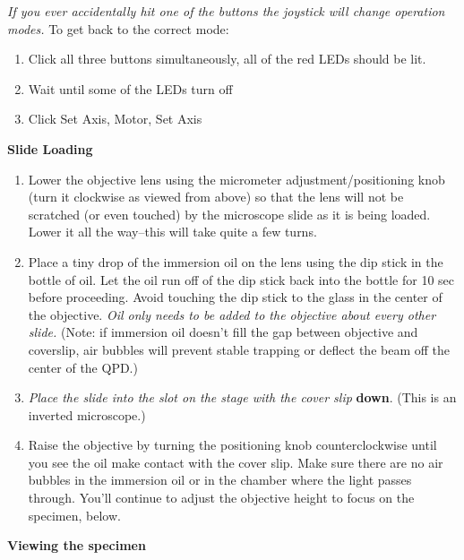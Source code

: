 \documentclass{../lab}
\begin{document}
\emph{If you ever accidentally hit one of the buttons the joystick will change operation modes.} To get back to the correct mode:

\newpage

\begin{enumerate}
    \item Click all three buttons simultaneously, all of the red LEDs should be lit.

    \item Wait until some of the LEDs turn off

    \item Click Set Axis, Motor, Set Axis
\end{enumerate}

\textbf{Slide Loading}

\begin{enumerate}
    \item Lower the objective lens using the micrometer adjustment/positioning knob (turn it clockwise as viewed from above) so that the lens will not be scratched (or even touched) by the microscope slide as it is being loaded. Lower it all the way--this will take quite a few turns.

    \item Place a tiny drop of the immersion oil on the lens using the dip stick in the bottle of oil. Let the oil run off of the dip stick back into the bottle for 10 sec before proceeding. Avoid touching the dip stick to the glass in the center of the objective. \emph{Oil only needs to be added to the objective about every other slide.} (Note: if immersion oil doesn't fill the gap between objective and coverslip, air bubbles will prevent stable trapping or deflect the beam off the center of the QPD.)

    \item \emph{Place the slide into the slot on the stage with the cover slip} \textbf{down}. (This is an inverted microscope.)

    \item Raise the objective by turning the positioning knob counterclockwise until you see the oil make contact with the cover slip. Make sure there are no air bubbles in the immersion oil or in the chamber where the light passes through. You'll continue to adjust the objective height to focus on the specimen, below.
\end{enumerate}

\textbf{Viewing the specimen}
\end{document}
